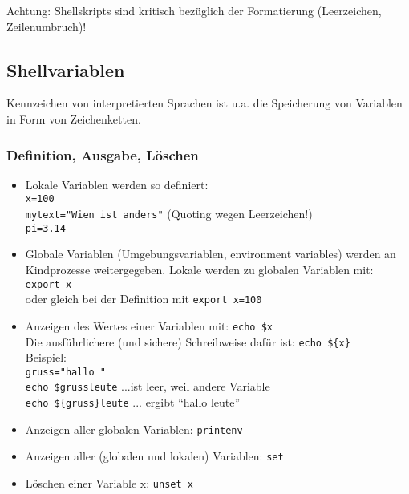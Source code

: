 \documentclass[11pt]{article}
\begin{document}
Achtung: Shellskripts sind kritisch bezüglich der Formatierung (Leerzeichen, Zeilenumbruch)!

\subsection{Shellvariablen}
Kennzeichen von interpretierten Sprachen ist u.a. die Speicherung von
Variablen in Form von Zeichenketten. 

\subsubsection{Definition, Ausgabe, Löschen}
\begin{itemize}
\item Lokale Variablen werden so definiert:\\
\texttt{x=100}\\
\texttt{mytext="Wien ist anders"} (Quoting wegen Leerzeichen!)\\
\texttt{pi=3.14}

\item Globale Variablen (Umgebungsvariablen, environment variables) werden
an Kindprozesse weitergegeben. Lokale werden zu globalen Variablen
mit:
\texttt{export x}\\
oder gleich bei der Definition mit
\texttt{export x=100}

\item Anzeigen des Wertes einer Variablen mit:
\texttt{echo \$x}\\
Die ausführlichere (und sichere) Schreibweise dafür ist: 
\texttt{echo \$\{x\}}\\

Beispiel:\\
\texttt{gruss="hallo "}\\
\texttt{echo \$grussleute} ...ist leer, weil andere Variable\\
\texttt{echo \$\{gruss\}leute} ... ergibt ``hallo leute'' 

\item Anzeigen aller globalen Variablen:
\texttt{printenv}

\item Anzeigen aller (globalen und lokalen) Variablen:
\texttt{set}

\item Löschen einer Variable x:
\texttt{unset x}
\end{itemize}
\end{document}
